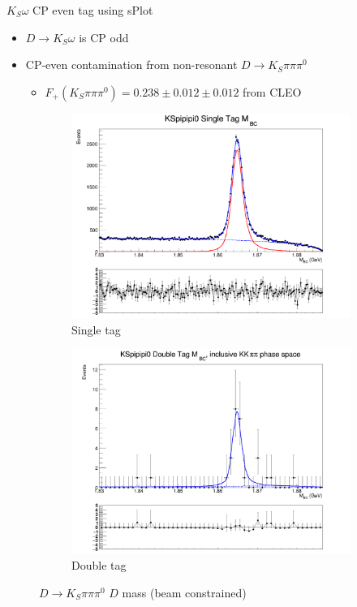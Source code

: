 \documentclass{beamer}
\begin{document}
\begin{frame}{$K_S\omega$ CP even tag using sPlot}
  \begin{itemize}
    \setlength\itemsep{0.5em}
    \item{$D\to K_S\omega$ is CP odd}
    \item{CP-even contamination from non-resonant $D\to K_S\pi\pi\pi^0$}
    \begin{itemize}
      \item{$F_+(K_S\pi\pi\pi^0) = 0.238\pm0.012\pm0.012$ from CLEO}
    \end{itemize}
  \end{itemize}
  \begin{figure}
    \centering
    \vspace{-0.2cm}
    \begin{subfigure}{0.40\textwidth}
      \includegraphics[width = 1.0\textwidth]{Plots/KSpipipi0_SingleTag_MBC_Plot.png}
      \caption{Single tag}
    \end{subfigure}%
    \begin{subfigure}{0.40\textwidth}
      \includegraphics[width = 1.0\textwidth]{Plots/DoubleTagYield_DoubleTag_CP_KKpipi_vs_KSpipipi0_SignalBin0.png}
      \caption{Double tag}
    \end{subfigure}
    \caption{$D\to K_S\pi\pi\pi^0$ $D$ mass (beam constrained)}
  \end{figure}
\end{frame}
\end{document}
